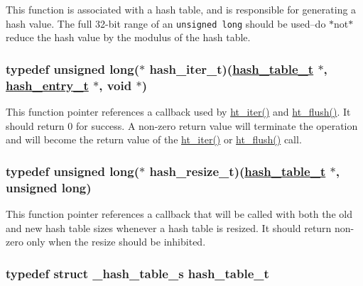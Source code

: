 This function is associated with a hash table, and is responsible for generating a hash value. The full 32-bit range of an {\tt unsigned long} should be used--do $\ast$not$\ast$ reduce the hash value by the modulus of the hash table. \hypertarget{group__dbprim__hash_a2}{
\subsubsection[hash\_\-iter\_\-t]{\setlength{\rightskip}{0pt plus 5cm}typedef unsigned long($\ast$ hash\_\-iter\_\-t)(\hyperlink{group__dbprim__hash_a0}{hash\_\-table\_\-t} $\ast$, \hyperlink{group__dbprim__hash_a1}{hash\_\-entry\_\-t} $\ast$, void $\ast$)}}
\label{group__dbprim__hash_a2}


This function pointer references a callback used by \hyperlink{group__dbprim__hash_a11}{ht\_\-iter()} and \hyperlink{group__dbprim__hash_a12}{ht\_\-flush()}. It should return 0 for success. A non-zero return value will terminate the operation and will become the return value of the \hyperlink{group__dbprim__hash_a11}{ht\_\-iter()} or \hyperlink{group__dbprim__hash_a12}{ht\_\-flush()} call. \hypertarget{group__dbprim__hash_a5}{
\subsubsection[hash\_\-resize\_\-t]{\setlength{\rightskip}{0pt plus 5cm}typedef unsigned long($\ast$ hash\_\-resize\_\-t)(\hyperlink{group__dbprim__hash_a0}{hash\_\-table\_\-t} $\ast$, unsigned long)}}
\label{group__dbprim__hash_a5}


This function pointer references a callback that will be called with both the old and new hash table sizes whenever a hash table is resized. It should return non-zero only when the resize should be inhibited. \hypertarget{group__dbprim__hash_a0}{
\subsubsection[hash\_\-table\_\-t]{\setlength{\rightskip}{0pt plus 5cm}typedef struct \_\-hash\_\-table\_\-s hash\_\-table\_\-t}}
\label{group__dbprim__hash_a0}


